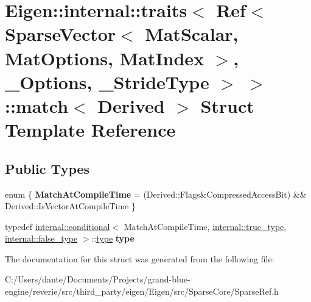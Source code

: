 \hypertarget{struct_eigen_1_1internal_1_1traits_3_01_ref_3_01_sparse_vector_3_01_mat_scalar_00_01_mat_options4b581d834744f71c5c7313d6641690e6}{}\section{Eigen\+::internal\+::traits$<$ Ref$<$ Sparse\+Vector$<$ Mat\+Scalar, Mat\+Options, Mat\+Index $>$, \+\_\+\+Options, \+\_\+\+Stride\+Type $>$ $>$\+::match$<$ Derived $>$ Struct Template Reference}
\label{struct_eigen_1_1internal_1_1traits_3_01_ref_3_01_sparse_vector_3_01_mat_scalar_00_01_mat_options4b581d834744f71c5c7313d6641690e6}
\subsection*{Public Types}
\begin{DoxyCompactItemize}
\item 
\mbox{\label{struct_eigen_1_1internal_1_1traits_3_01_ref_3_01_sparse_vector_3_01_mat_scalar_00_01_mat_options4b581d834744f71c5c7313d6641690e6_a1c07f058a9ca5544d31224adce3435c4}} 
enum \{ {\bfseries Match\+At\+Compile\+Time} = (Derived\+::Flags\&Compressed\+Access\+Bit) \&\& Derived\+::Is\+Vector\+At\+Compile\+Time
 \}
\item 
\mbox{\label{struct_eigen_1_1internal_1_1traits_3_01_ref_3_01_sparse_vector_3_01_mat_scalar_00_01_mat_options4b581d834744f71c5c7313d6641690e6_a0090fbf7183b2401eaf865a069870caf}} 
typedef \mbox{\hyperlink{struct_eigen_1_1internal_1_1conditional}{internal\+::conditional}}$<$ Match\+At\+Compile\+Time, \mbox{\hyperlink{struct_eigen_1_1internal_1_1true__type}{internal\+::true\+\_\+type}}, \mbox{\hyperlink{struct_eigen_1_1internal_1_1false__type}{internal\+::false\+\_\+type}} $>$\+::\mbox{\hyperlink{struct_eigen_1_1internal_1_1true__type}{type}} {\bfseries type}
\end{DoxyCompactItemize}


The documentation for this struct was generated from the following file\+:\begin{DoxyCompactItemize}
\item 
C\+:/\+Users/dante/\+Documents/\+Projects/grand-\/blue-\/engine/reverie/src/third\+\_\+party/eigen/\+Eigen/src/\+Sparse\+Core/Sparse\+Ref.\+h\end{DoxyCompactItemize}

